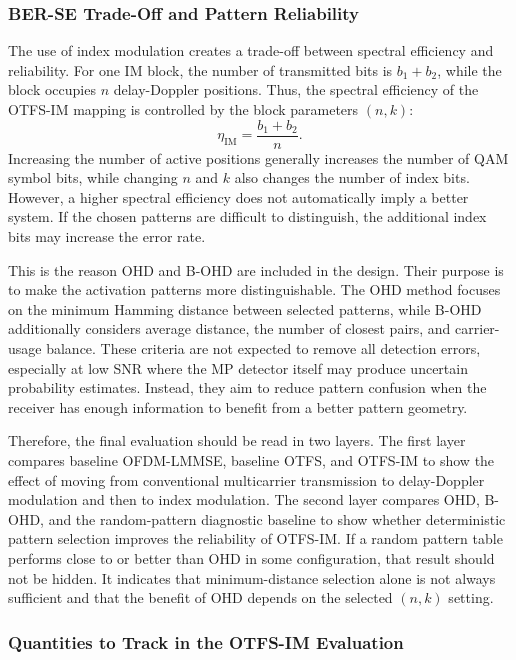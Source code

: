 \subsubsection{BER-SE Trade-Off and Pattern Reliability}

The use of index modulation creates a trade-off between spectral efficiency and reliability. For one IM block, the number of transmitted bits is \(b_1+b_2\), while the block occupies \(n\) delay-Doppler positions. Thus, the spectral efficiency of the OTFS-IM mapping is controlled by the block parameters \((n,k)\):
\begin{equation}
    \eta_{\mathrm{IM}}
    =
    \frac{b_1+b_2}{n}.
    \label{eq:chapter4_im_se_summary}
\end{equation}
Increasing the number of active positions generally increases the number of QAM symbol bits, while changing \(n\) and \(k\) also changes the number of index bits. However, a higher spectral efficiency does not automatically imply a better system. If the chosen patterns are difficult to distinguish, the additional index bits may increase the error rate.

This is the reason OHD and B-OHD are included in the design. Their purpose is to make the activation patterns more distinguishable. The OHD method focuses on the minimum Hamming distance between selected patterns, while B-OHD additionally considers average distance, the number of closest pairs, and carrier-usage balance. These criteria are not expected to remove all detection errors, especially at low SNR where the MP detector itself may produce uncertain probability estimates. Instead, they aim to reduce pattern confusion when the receiver has enough information to benefit from a better pattern geometry.

Therefore, the final evaluation should be read in two layers. The first layer compares baseline OFDM-LMMSE, baseline OTFS, and OTFS-IM to show the effect of moving from conventional multicarrier transmission to delay-Doppler modulation and then to index modulation. The second layer compares OHD, B-OHD, and the random-pattern diagnostic baseline to show whether deterministic pattern selection improves the reliability of OTFS-IM. If a random pattern table performs close to or better than OHD in some configuration, that result should not be hidden. It indicates that minimum-distance selection alone is not always sufficient and that the benefit of OHD depends on the selected \((n,k)\) setting.

\subsubsection{Quantities to Track in the OTFS-IM Evaluation}

